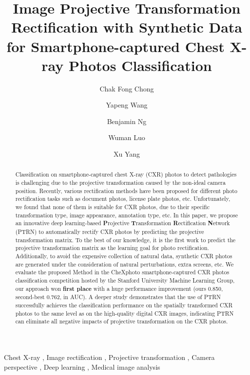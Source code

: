 \documentclass[preprint, 12pt]{elsarticle}
\begin{document}
\begin{frontmatter}





\title{Image Projective Transformation Rectification with Synthetic Data for Smartphone-captured Chest X-ray Photos Classification }



\author[MPU]{Chak Fong Chong}
\author[MPU]{Yapeng Wang}
\author[MPU]{Benjamin Ng}
\author[MPU]{Wuman Luo}
\author[MPU]{Xu Yang}




\address[MPU]{Macao Polytechnic University, Macao SAR, China}

\begin{abstract}

Classification on smartphone-captured chest X-ray (CXR) photos to detect pathologies is challenging due to the projective transformation caused by the non-ideal camera position. Recently, various rectification methods have been proposed for different photo rectification tasks such as document photos, license plate photos, etc. Unfortunately, we found that none of them is suitable for CXR photos, due to their specific transformation type, image appearance, annotation type, etc. In this paper, we propose an innovative deep learning-based \textbf{P}rojective \textbf{T}ransformation \textbf{R}ectification \textbf{N}etwork (PTRN) to automatically rectify CXR photos by predicting the projective transformation matrix. To the best of our knowledge, it is the first work to predict the projective transformation matrix as the learning goal for photo rectification. Additionally, to avoid the expensive collection of natural data, synthetic CXR photos are generated under the consideration of natural perturbations, extra screens, etc. We evaluate the proposed Method in the CheXphoto smartphone-captured CXR photos classification competition hosted by the Stanford University Machine Learning Group, our approach won \textbf{first place} with a huge performance improvement (ours 0.850, second-best 0.762, in AUC). A deeper study demonstrates that the use of PTRN successfully achieves the classification performance on the spatially transformed CXR photos to the same level as on the high-quality digital CXR images, indicating PTRN can eliminate all negative impacts of projective transformation on the CXR photos.

\end{abstract}





\begin{keyword}
Chest X-ray \sep
Image rectification \sep
Projective transformation \sep
Camera perspective \sep
Deep learning \sep
Medical image analysis




\end{keyword}

\end{frontmatter}
\end{document}
